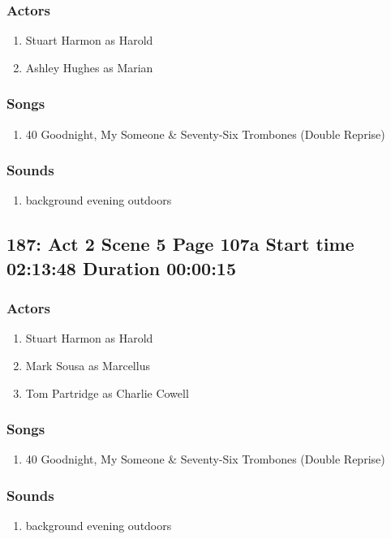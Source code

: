 \subsubsection{Actors}
\begin{enumerate}
\item Stuart Harmon as Harold
\item Ashley Hughes as Marian
\end{enumerate}

\subsubsection{Songs}
\begin{enumerate}
\item 40 Goodnight, My Someone \& Seventy-Six Trombones (Double Reprise)
\end{enumerate}\subsubsection{Sounds}
\begin{enumerate}
\item background evening outdoors
\end{enumerate}
\subsection{187: Act 2 Scene 5 Page 107a Start time 02:13:48 Duration 00:00:15}

\subsubsection{Actors}
\begin{enumerate}
\item Stuart Harmon as Harold
\item Mark Sousa as Marcellus
\item Tom Partridge as Charlie Cowell
\end{enumerate}

\subsubsection{Songs}
\begin{enumerate}
\item 40 Goodnight, My Someone \& Seventy-Six Trombones (Double Reprise)
\end{enumerate}\subsubsection{Sounds}
\begin{enumerate}
\item background evening outdoors
\end{enumerate}
